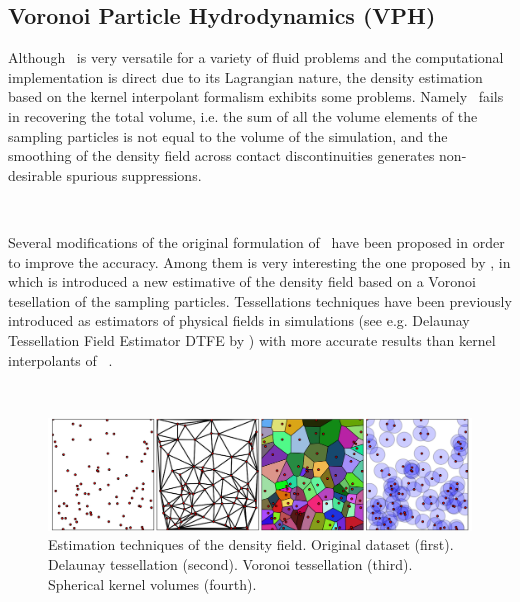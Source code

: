 \documentclass[a4,useAMS,usenatbib,usegraphicx,12pt]{article}
\begin{document}
\subsection*{Voronoi Particle Hydrodynamics (VPH)}

Although \SPH\ is very versatile for a variety of fluid problems and the
computational implementation is direct due to its Lagrangian nature, the density
estimation based on the kernel interpolant formalism exhibits some problems. 
Namely \SPH\ fails in recovering the total volume, i.e. the sum of all the 
volume elements of the sampling particles is not equal to the volume of the
simulation, and the smoothing of the density field across contact discontinuities
generates non-desirable spurious suppressions.

\

Several modifications of the original formulation of \SPH\ have been proposed in
order to improve the accuracy. Among them is very interesting the one proposed 
by \citet{Hess10}, in which is introduced a new estimative of the density field 
based on a Voronoi tesellation of the sampling particles. Tessellations 
techniques have been previously introduced as estimators of physical fields in
simulations (see e.g. Delaunay Tessellation Field Estimator DTFE by 
\citet{Schaap00}) with more accurate results than kernel interpolants of \SPH\
\citep{Pelupessy03}.

\
\begin{figure}[h]
\centering

  \includegraphics[trim = 0mm 0mm 0mm 0mm, clip, keepaspectratio=true,
  width=0.7\textheight]{./figures/Tessellations.png}
  
  \caption{\small Estimation techniques of the density field. Original 
  dataset (first). Delaunay tessellation (second). Voronoi tessellation 
  (third). Spherical kernel volumes (fourth). }

  \label{fig:Tessellations}

\end{figure}
\end{document}
